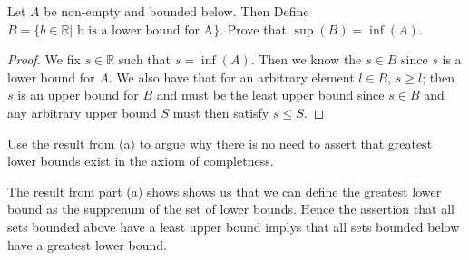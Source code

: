 \documentclass[11pt,largemargins]{homework}
\newcommand{\R}{\mathbb{R}}
\begin{document}
\question 

\begin{alphaparts}
    \questionpart 
    Let $A$ be non-empty and bounded below. Then
    Define $B = \{ b \in \R | \text{ b is a lower bound for A} \}$. Prove that 
    $\sup(B) = \inf(A)$. 

    \begin{proof}
        We fix $s \in \R$ such that $s = \inf(A)$. Then we know the $s \in B$ since $s$ is a lower bound for $A$. We also have that 
        for an arbitrary element $l \in B$, $s \geq l$; then $s$ is an upper bound for $B$ and must be the least upper bound since 
        $s \in B$ and any arbitrary upper bound $S$ must then satisfy $s \leq S$. 
    \end{proof}

    \questionpart 
    Use the result from (a) to argue why there is no need to assert that greatest lower bounds exist in the axiom of completness. 

    The result from part (a) shows shows us that we can define the greatest lower bound as the supprenum of the set of lower bounds. 
    Hence the assertion that all sets bounded above have a least upper bound implys that all sets bounded below have a greatest lower bound. 
\end{alphaparts}
\end{document}
